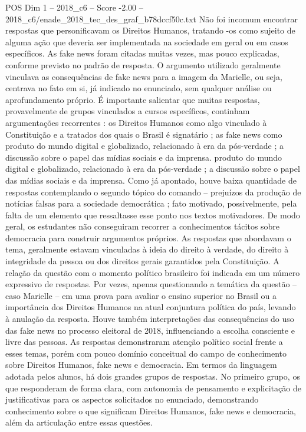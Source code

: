 \begin{textsample}{POS Dim 1 – 2018\_c6 – Score -2.00 – 2018\_c6/enade\_2018\_tec\_des\_graf\_b78dccf50c.txt}
Não foi incomum encontrar respostas que personificavam os Direitos Humanos, tratando -os como sujeito de alguma ação que deveria ser implementada na sociedade em geral ou em casos específicos.
As fake news foram citadas muitas vezes, mas pouco explicadas, conforme previsto no padrão de resposta.
O argumento utilizado geralmente vinculava as consequências de fake news para a imagem da Marielle, ou seja, centrava no fato em si, já indicado no enunciado, sem qualquer análise ou aprofundamento próprio.
É importante salientar que muitas respostas, provavelmente de grupos vinculados a cursos específicos, continham argumentações recorrentes : os Direitos Humanos como algo vinculado à Constituição e a tratados dos quais o Brasil é signatário ; as fake news como produto do mundo digital e globalizado, relacionado à era da pós-verdade ; a discussão sobre o papel das mídias sociais e da imprensa. produto do mundo digital e globalizado, relacionado à era da pós-verdade ; a discussão sobre o papel das mídias sociais e da imprensa.
Como já apontado, houve baixa quantidade de respostas contemplando o segundo tópico do comando – prejuízos da produção de notícias falsas para a sociedade democrática ; fato motivado, possivelmente, pela falta de um elemento que ressaltasse esse ponto nos textos motivadores.
De modo geral, os estudantes não conseguiram recorrer a conhecimentos tácitos sobre democracia para construir argumentos próprios.
As respostas que abordavam o tema, geralmente estavam vinculadas à ideia do direito à verdade, do direito à integridade da pessoa ou dos direitos gerais garantidos pela Constituição.
A relação da questão com o momento político brasileiro foi indicada em um número expressivo de respostas.
Por vezes, apenas questionando a temática da questão – caso Marielle – em uma prova para avaliar o ensino superior no Brasil ou a importância dos Direitos Humanos na atual conjuntura política do país, levando à anulação da resposta.
Houve também interpretações das consequências do uso das fake news no processo eleitoral de 2018, influenciando a escolha consciente e livre das pessoas.
As respostas demonstraram atenção político social frente a esses temas, porém com pouco domínio conceitual do campo de conhecimento sobre Direitos Humanos, fake news e democracia.
Em termos da linguagem adotada pelos alunos, há dois grandes grupos de respostas.
No primeiro grupo, os que responderam de forma clara, com autonomia de pensamento e explicitação de justificativas para os aspectos solicitados no enunciado, demonstrando conhecimento sobre o que significam Direitos Humanos, fake news e democracia, além da articulação entre essas questões.

\end{textsample}
